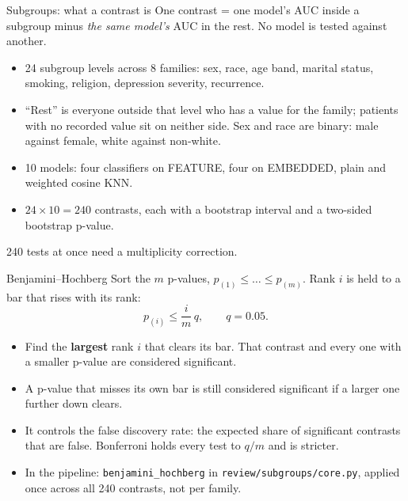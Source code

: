 \documentclass[aspectratio=169]{beamer}
\begin{document}
\begin{frame}{Subgroups: what a contrast is}
  One contrast = one model's AUC inside a subgroup minus \emph{the same model's} AUC in the rest. No model is tested against another.
  \begin{itemize}
    \item 24 subgroup levels across 8 families: sex, race, age band, marital status, smoking, religion, depression severity, recurrence.
    \item ``Rest'' is everyone outside that level who has a value for the family; patients with no recorded value sit on neither side. Sex and race are binary: male against female, white against non-white.
    \item 10 models: four classifiers on FEATURE, four on EMBEDDED, plain and weighted cosine KNN.
    \item $24\times 10 = 240$ contrasts, each with a bootstrap interval and a two-sided bootstrap p-value.
  \end{itemize}
  240 tests at once need a multiplicity correction.
\end{frame}

\begin{frame}{Benjamini--Hochberg}
  Sort the $m$ p-values, $p_{(1)}\le\dots\le p_{(m)}$. Rank $i$ is held to a bar that rises with its rank:
  \[
    p_{(i)} \le \frac{i}{m}\,q, \qquad q = 0.05.
  \]
  \begin{itemize}
    \item Find the \textbf{largest} rank $i$ that clears its bar. That contrast and every one with a smaller p-value are considered significant.
    \item A p-value that misses its own bar is still considered significant if a larger one further down clears.
    \item It controls the false discovery rate: the expected share of significant contrasts that are false. Bonferroni holds every test to $q/m$ and is stricter.
    \item In the pipeline: \texttt{benjamini\_hochberg} in \texttt{review/subgroups/core.py}, applied once across all 240 contrasts, not per family.
  \end{itemize}
\end{frame}
\end{document}
